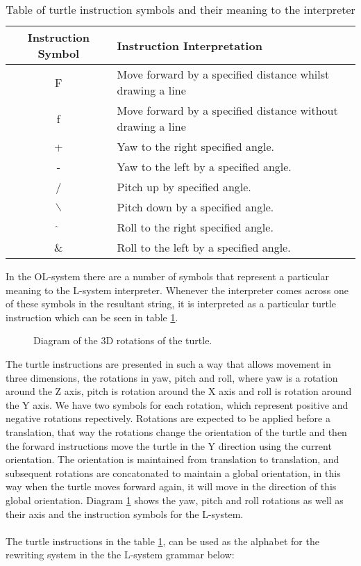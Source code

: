 \begin{table}[h!]
\centering
\begin{tabular}{ | c | l | }
\hline
	Instruction Symbol 	& Instruction Interpretation \\  
\hline
\hline
	F 					& Move forward by a specified distance whilst drawing a line\\
\hline
	f 					& Move forward by a specified distance without drawing a line\\
\hline
	+ 					& Yaw to the right specified angle.\\
\hline
	- 					& Yaw to the left by a specified angle.\\
\hline
	/ 					& Pitch up by specified angle. \\
\hline
	$\backslash$ 		& Pitch down by a specified angle.\\
\hline
	$\hat{}$ 			& Roll to the right specified angle.\\
\hline
	\& 					& Roll to the left by a specified angle.\\
\hline
\end{tabular}
\caption{Table of turtle instruction symbols and their meaning to the interpreter}
\label{instruction table 1}
\end{table}
\FloatBarrier

\noindent
In the OL-system there are a number of symbols that represent a particular meaning to the L-system interpreter. Whenever the interpreter comes across one of these symbols in the resultant string, it is interpreted as a particular turtle instruction which can be seen in table \ref{instruction table 1}. 

\begin{figure}[htbp]
	{\centering
		\setlength{\fboxrule}{1pt}
		\vspace{7px}
		\caption{Diagram of the 3D rotations of the turtle.} \label{3D rotations}
	}
\end{figure}
\FloatBarrier

\noindent
The turtle instructions are presented in such a way that allows movement in three dimensions, the rotations in yaw, pitch and roll, where yaw is a rotation around the Z axis, pitch is rotation around the X axis and roll is rotation around the Y axis. We have two symbols for each rotation, which represent positive and negative rotations repectively. Rotations are expected to be applied before a translation, that way the rotations change the orientation of the turtle and then the forward instructions move the turtle in the Y direction using the current orientation. The orientation is maintained from translation to translation, and subsequent rotations are concatonated to maintain a global orientation, in this way when the turtle moves forward again, it will move in the direction of this global orientation. Diagram  \ref{3D rotations} shows the yaw, pitch and roll rotations as well as their axis and the instruction symbols for the L-system.\\
\\
The turtle instructions in the table \ref{instruction table 1}, can be used as the alphabet for the rewriting system in the the L-system grammar below:

